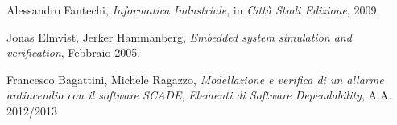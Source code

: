 \begin{thebibliography}{10}

\frenchspacing

\bibitem{}
Alessandro Fantechi, \textit{Informatica Industriale}, in \textit{Città Studi Edizione}, 2009.

\bibitem{}
Jonas Elmvist, Jerker Hammanberg, \emph{Embedded system simulation and verification}, Febbraio 2005.

\bibitem{}
Francesco Bagattini, Michele Ragazzo, \emph{Modellazione e verifica di un allarme antincendio con il software SCADE}, \emph{Elementi di Software Dependability}, A.A. 2012/2013


\end{thebibliography}
